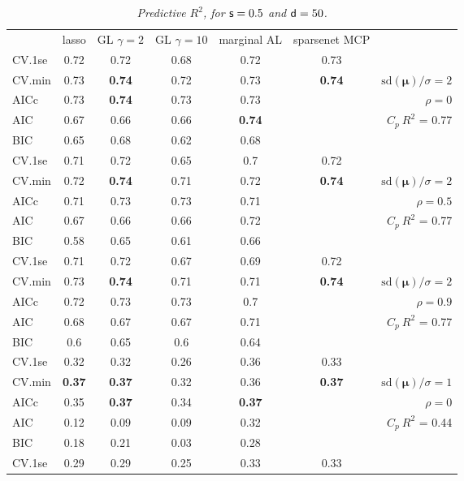 \documentclass[12pt]{article}
\newcommand{\mr}[1]{\mathrm{#1}}
\newcommand{\bm}[1]{\mathbf{#1}}
\begin{document}
\begin{table}[p]\vspace{-.5cm}
\caption[l]{\label{r2}\it Predictive $R^2$, for ${\sf s}=0.5$ and  ${\sf d}=50$.}
\vspace{-.5cm}
\small{}
\begin{center}
\begin{tabular}{l*{5}{c}|r}
 & lasso & GL $\gamma=2$ & GL $\gamma=10$ & marginal AL & sparsenet MCP  &  \\
\cline{1-7}
CV.1se & 0.72 & 0.72 & 0.68 & 0.72 & 0.73 &\\
CV.min & 0.73 & {\bf 0.74} & 0.72 & 0.73 & {\bf 0.74} &  $\mr{sd}(\bm{\mu})/\sigma=2$ \\
AICc & 0.73 & {\bf 0.74} & 0.73 & 0.73 & & $\rho=0$ \\
AIC & 0.67 & 0.66 & 0.66 & {\bf 0.74} & & \multirow{2}{*}{$C_p ~ R^2$ = 0.77} \\
BIC & 0.65 & 0.68 & 0.62 & 0.68 & & \\
 \hline 
CV.1se & 0.71 & 0.72 & 0.65 & 0.7 & 0.72 &\\
CV.min & 0.72 & {\bf 0.74} & 0.71 & 0.72 & {\bf 0.74} &  $\mr{sd}(\bm{\mu})/\sigma=2$ \\
AICc & 0.71 & 0.73 & 0.73 & 0.71 & & $\rho=0.5$ \\
AIC & 0.67 & 0.66 & 0.66 & 0.72 & & \multirow{2}{*}{$C_p ~ R^2$ = 0.77} \\
BIC & 0.58 & 0.65 & 0.61 & 0.66 & & \\
 \hline 
CV.1se & 0.71 & 0.72 & 0.67 & 0.69 & 0.72 &\\
CV.min & 0.73 & {\bf 0.74} & 0.71 & 0.71 & {\bf 0.74} &  $\mr{sd}(\bm{\mu})/\sigma=2$ \\
AICc & 0.72 & 0.73 & 0.73 & 0.7 & & $\rho=0.9$ \\
AIC & 0.68 & 0.67 & 0.67 & 0.71 & & \multirow{2}{*}{$C_p ~ R^2$ = 0.77} \\
BIC & 0.6 & 0.65 & 0.6 & 0.64 & & \\
 \hline 
CV.1se & 0.32 & 0.32 & 0.26 & 0.36 & 0.33 &\\
CV.min & {\bf 0.37} & {\bf 0.37} & 0.32 & 0.36 & {\bf 0.37} &  $\mr{sd}(\bm{\mu})/\sigma=1$ \\
AICc & 0.35 & {\bf 0.37} & 0.34 & {\bf 0.37} & & $\rho=0$ \\
AIC & 0.12 & 0.09 & 0.09 & 0.32 & & \multirow{2}{*}{$C_p ~ R^2$ = 0.44} \\
BIC & 0.18 & 0.21 & 0.03 & 0.28 & & \\
 \hline 
CV.1se & 0.29 & 0.29 & 0.25 & 0.33 & 0.33 &\\

\end{tabular}
\end{center}
\end{table}
\end{document}
